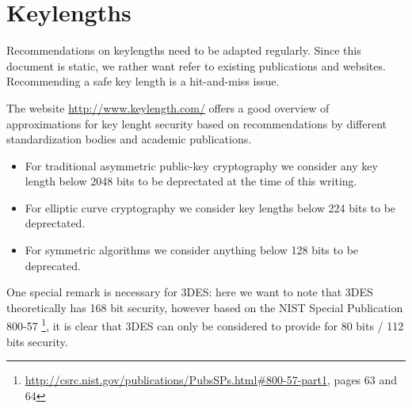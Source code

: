 \section{Keylengths}
\label{section:keylengths}

Recommendations on keylengths need to be adapted regularly. Since this document
is static, we rather want refer to existing publications and websites.
Recommending a safe key length is a hit-and-miss issue.

The website \url{http://www.keylength.com/} offers a good overview of approximations for
key lenght security based on recommendations by different standardization bodies and
academic publications.

\begin{itemize}
\item For traditional asymmetric public-key cryptography we consider any key length below 2048 bits to be
deprectated at the time of this writing.  
\item For elliptic curve cryptography we consider key lengths below 224 bits to be deprectated.  
\item For symmetric algorithms we consider anything below 128 bits to be deprecated.
\end{itemize}


One special remark is necessary for 3DES: here we want to note that 3DES
theoretically has 168 bit security, however based on the NIST Special
Publication 800-57
\footnote{\url{http://csrc.nist.gov/publications/PubsSPs.html\#800-57-part1},
pages 63 and 64}, it is clear that 3DES can only be considered to provide for 
80 bits / 112 bits security.





